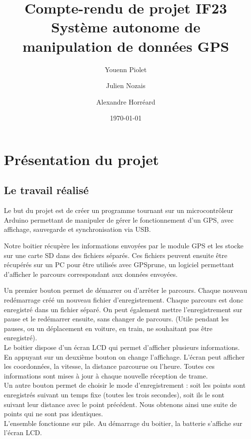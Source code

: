 \documentclass[a4paper,12pt,titlepage]{article}
\title{Compte-rendu de projet IF23\\Système autonome de manipulation de données GPS}
\author{Youenn Piolet \and Julien Nozais \and Alexandre Horréard}
\date{\today} %
\begin{document}
\maketitle

\tableofcontents

\newpage

\section{Présentation du projet}

\subsection{Le travail réalisé}

Le but du projet est de créer un programme tournant sur un microcontrôleur
Arduino permettant de manipuler de gérer le fonctionnement d'un GPS, avec
affichage, sauvegarde et synchronisation via USB.

Notre boitier récupère les informations envoyées par le module GPS et les
stocke sur une carte SD dans des fichiers séparés. Ces fichiers peuvent
ensuite être récupérés sur un PC pour être utilisés avec GPSprune, un
logiciel permettant d'afficher le parcours correspondant aux données envoyées.

\bigskip
Un premier bouton permet de démarrer ou d'arrêter le parcours. Chaque nouveau
redémarrage créé un nouveau fichier d'enregistrement. Chaque parcours
est donc enregistré dans un fichier séparé. On peut également mettre
l'enregistrement sur pause et le redémarrer ensuite, sans changer de parcours.
(Utile pendant les pauses, ou un déplacement en voiture, en train, ne souhaitant
pas être enregistré).
\\
Le boitier dispose d'un écran LCD qui permet d'afficher plusieurs informations.
En appuyant sur un deuxième bouton on change l'affichage. L'écran peut afficher
les coordonnées, la vitesse, la distance parcourue ou l'heure. Toutes ces
informations sont mises à jour à chaque nouvelle réception de trame.
\\
Un autre bouton permet de choisir le mode d'enregistrement : soit les points
sont enregistrés suivant un temps fixe (toutes les trois secondes), soit ils le
sont suivant leur distance avec le point précédent. Nous obtenons ainsi une
suite de points qui ne sont pas identiques.
\\
L'ensemble fonctionne sur pile. Au démarrage du boitier, la batterie s'affiche
sur l'écran LCD.
\end{document}

